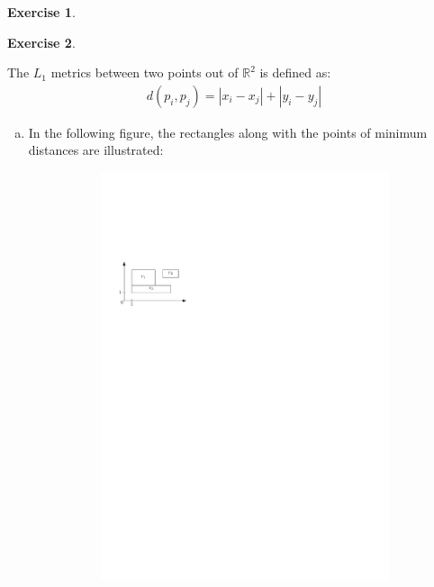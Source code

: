 \documentclass[a4paper,12pt,headsepline]{scrartcl}
\newtheorem{aufgabe}{Exercise}
\begin{document}
\begin{aufgabe}
\end{aufgabe}

\newpage
\begin{aufgabe}
\end{aufgabe}
The $L_1$ metrics between two points out of $\mathbb{R}^2$ is defined as:
\begin{align*}
d(p_i,p_j) = |x_i - x_j| + |y_i - y_j|
\end{align*}
\begin{enumerate}[a)]
	\item In the following figure, the rectangles along with the points of minimum distances are illustrated:
	\begin{figure}[H]
		\centering
		\begin{subfigure}{0.48\textwidth}
			\centering
			\includegraphics[width=1\linewidth,page=1]{graphics/7_2.pdf}

\end{subfigure}
\end{figure}
\end{enumerate}
\end{document}
